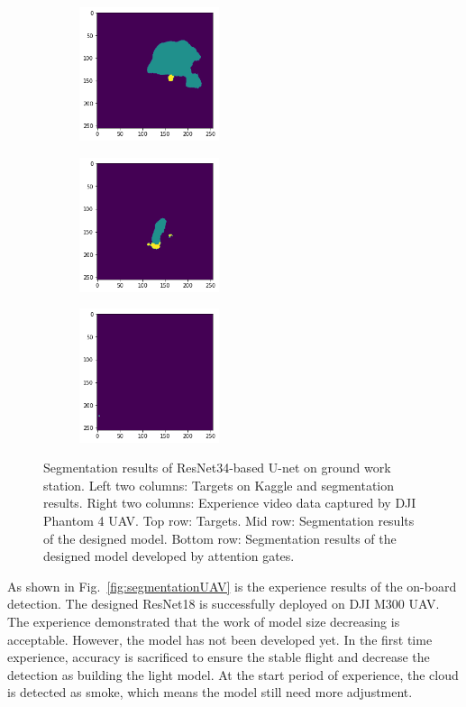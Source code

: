 \begin{figure}[ht]
\begin{subfigure}{.24\linewidth}
    \end{subfigure}
    \begin{subfigure}{.24\linewidth}
    \centering
        \includegraphics[width = 41mm]{figs/atunet2.png}
    \end{subfigure}
        \begin{subfigure}{.24\linewidth}
    \centering
        \includegraphics[width = 41mm]{figs/atunet3.png}
    \end{subfigure}
    \begin{subfigure}{.24\linewidth}
    \centering
        \includegraphics[width = 41mm]{figs/atunet4.png}
    \end{subfigure}
\caption{Segmentation results of ResNet34-based U-net on ground work station. Left two columns: Targets on Kaggle and segmentation results. Right two columns: Experience video data captured by DJI Phantom 4 UAV. Top row: Targets. Mid row: Segmentation results of the designed model. Bottom row: Segmentation results of the designed model developed by attention gates.}
\label{fig:segmentationGround}
\end{figure}\par
As shown in Fig.~\ref{fig:segmentationUAV} is the experience results of the on-board detection. The designed ResNet18 is successfully deployed on DJI M300 UAV. The experience demonstrated that the work of model size decreasing is acceptable. However, the model has not been developed yet. In the first time experience, accuracy is sacrificed to ensure the stable flight and decrease the detection as building the light model. At the start period of experience, the cloud is detected as smoke, which means the model still need more adjustment.
